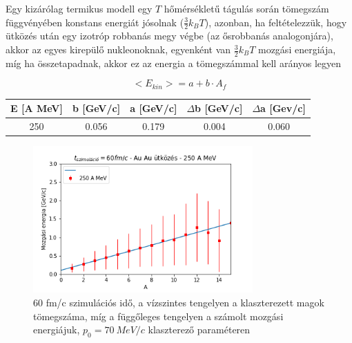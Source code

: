 \documentclass[a4paper,12pt]{article}
\begin{document}
\vspace{5mm}

\par Egy kizárólag termikus modell egy $T$ hőmérsékletű tágulás során tömegszám függvényében konstans energiát jósolnak ($\frac{3}{2}k_{B}T$), azonban, ha feltételezzük, hogy ütközés után egy izotróp robbanás megy végbe (az ősrobbanás analogonjára), akkor az egyes kirepülő nukleonoknak, egyenként van $\frac{3}{2}k_{B}T$ mozgási energiája, míg ha összetapadnak, akkor ez az energia a tömegszámmal kell arányos legyen

\vspace{5mm}

\begin{equation}
<E_{kin}> = a + b\cdot A_{f}
\label{blast-model}
\end{equation}

\vspace{5mm}

\begin{center}
\begin{tabular}{|c|c|c|c|c|}
\hline
E [A MeV] & b [GeV/c] & a [GeV/c] & $\Delta$b [GeV/c] & $\Delta$a [Gev/c] \\
\hline
250 & 0.056 & 0.179 & 0.004 & 0.060 \\
\hline
\end{tabular}
\end{center}

\vspace{5mm}

\begin{figure}[!htb]
\centering
\includegraphics[width=0.75\textwidth]{./60fmcAuAu250AMeV007mom.png}
\caption{60 fm/c szimulációs idő, a vízszintes tengelyen a klaszterezett magok tömegszáma, míg a függőleges tengelyen a számolt mozgási energiájuk, $p_{0} = 70 ~MeV/c$ klaszterező paraméteren}
\end{figure}
\end{document}
